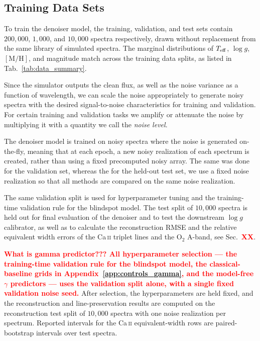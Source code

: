 \documentclass[twocolumn]{aastex7}
\newcommand{\ld}[1]{\textcolor{red}{\textbf{#1}}}
\begin{document}
\subsection{Training Data Sets}


To train the denoiser model, the training, validation, and test sets contain $200{,}000$, $1{,}000$, and $10{,}000$ spectra respectively, drawn without replacement from the same library of simulated spectra. The marginal distributions of $T_{\rm eff}$, $\log g$, $[\mathrm{M}/\mathrm{H}]$, and magnitude match across the training data splits, as listed in Tab.~\ref{tab:data_summary}.

Since the simulator outputs the clean flux, as well as the noise variance as a function of wavelength, we can scale the noise appropriately to generate noisy spectra with the desired signal-to-noise characteristics for training and validation. For certain training and validation tasks we amplify or attenuate the noise by multiplying it with a quantity we call the \textit{noise level}.

The denoiser model is trained on noisy spectra where the noise is generated on-the-fly, meaning that at each epoch, a new noisy realization of each spectrum is created, rather than using a fixed precomputed noisy array. The same was done for the validation set, whereas the for the held-out test set, we use a fixed noise realization so that all methods are compared on the same noise realization.

The same validation split is used for hyperparameter tuning and the training-time validation rule for the blindspot model. The test split of $10{,}000$ spectra is held out for final evaluation of the denoiser and to test the downstream $\log g$ calibrator, as well as to calculate the reconstruction RMSE and the relative equivalent width errors of the Ca\,\textsc{ii} triplet lines and the \mbox{O$_2$} A-band, see Sec.~\ld{XX}.

\ld{What is gamma predictor??? All hyperparameter selection --- the training-time validation rule for the blindspot model, the classical-baseline grids in Appendix~\ref{app:controls_gamma}, and the model-free $\gamma$ predictors --- uses the validation split alone, with a single fixed validation noise seed.} After selection, the hyperparameters are held fixed, and the reconstruction and line-preservation results are computed on the reconstruction test split of $10{,}000$ spectra with one noise realization per spectrum. Reported intervals for the Ca\,\textsc{ii} equivalent-width rows are paired-bootstrap intervals over test spectra.
\end{document}
